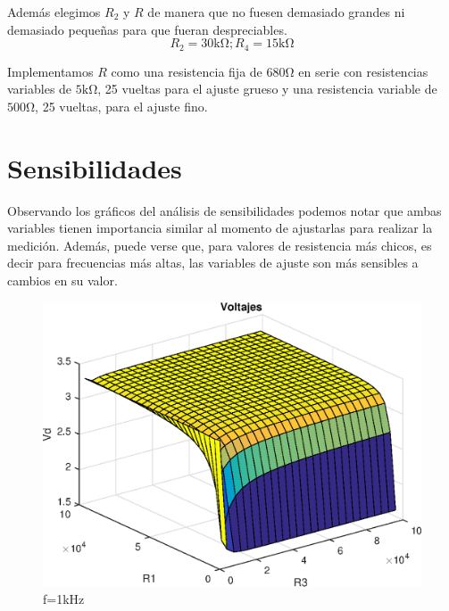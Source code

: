 Además elegimos $R_2$ y $R$ de manera que no fuesen demasiado grandes ni demasiado
pequeñas para que fueran despreciables.
\begin{equation}
    R_2 = 30\si{\kilo\ohm}; R_4=15\si{\kilo\ohm}
\end{equation}

Implementamos $R$ como una resistencia fija de $680\si{\ohm}$ en serie con resistencias
variables de $5\si{\kilo\ohm}$, 25 vueltas para el ajuste grueso y una resistencia variable
de $500\si{\ohm}$, 25 vueltas, para el ajuste fino.

\section{Sensibilidades}

Observando los gráficos del análisis de sensibilidades podemos notar que ambas variables 
tienen importancia similar al momento de ajustarlas para realizar la medición. Además, 
puede verse que, para valores de resistencia más chicos, es decir para frecuencias más altas, 
las variables de ajuste son más sensibles a cambios en su valor.

\begin{figure}[ht]
    \begin{center}
        \includegraphics[width=0.6\linewidth]{MATLAB/ej2Vd.eps}
        \caption{f=1kHz}
        \label{fig:ej2Vd}
    \end{center}
\end{figure}

